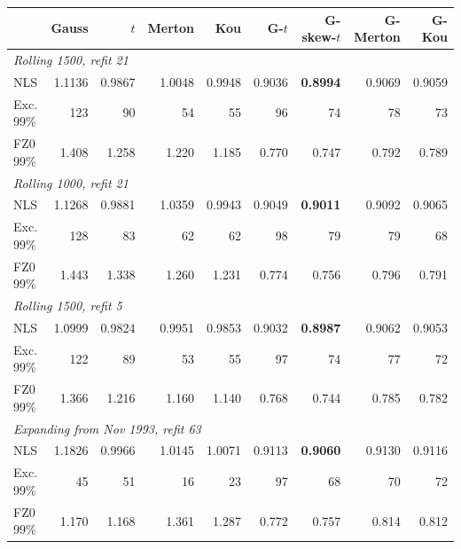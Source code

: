 \begin{tabular}{lrrrrrrrr}
\toprule
 & Gauss & $t$ & Merton & Kou & G-$t$ & G-skew-$t$ & G-Merton & G-Kou \\
\midrule
\multicolumn{9}{l}{\textit{Rolling 1500, refit 21}} \\
\quad NLS & 1.1136 & 0.9867 & 1.0048 & 0.9948 & 0.9036 & \textbf{0.8994} & 0.9069 & 0.9059 \\
\quad Exc. 99\% & 123 & 90 & 54 & 55 & 96 & 74 & 78 & 73 \\
\quad FZ0 99\% & 1.408 & 1.258 & 1.220 & 1.185 & 0.770 & 0.747 & 0.792 & 0.789 \\
\multicolumn{9}{l}{\textit{Rolling 1000, refit 21}} \\
\quad NLS & 1.1268 & 0.9881 & 1.0359 & 0.9943 & 0.9049 & \textbf{0.9011} & 0.9092 & 0.9065 \\
\quad Exc. 99\% & 128 & 83 & 62 & 62 & 98 & 79 & 79 & 68 \\
\quad FZ0 99\% & 1.443 & 1.338 & 1.260 & 1.231 & 0.774 & 0.756 & 0.796 & 0.791 \\
\multicolumn{9}{l}{\textit{Rolling 1500, refit 5}} \\
\quad NLS & 1.0999 & 0.9824 & 0.9951 & 0.9853 & 0.9032 & \textbf{0.8987} & 0.9062 & 0.9053 \\
\quad Exc. 99\% & 122 & 89 & 53 & 55 & 97 & 74 & 77 & 72 \\
\quad FZ0 99\% & 1.366 & 1.216 & 1.160 & 1.140 & 0.768 & 0.744 & 0.785 & 0.782 \\
\multicolumn{9}{l}{\textit{Expanding from Nov 1993, refit 63}} \\
\quad NLS & 1.1826 & 0.9966 & 1.0145 & 1.0071 & 0.9113 & \textbf{0.9060} & 0.9130 & 0.9116 \\
\quad Exc. 99\% & 45 & 51 & 16 & 23 & 97 & 68 & 70 & 72 \\
\quad FZ0 99\% & 1.170 & 1.168 & 1.361 & 1.287 & 0.772 & 0.757 & 0.814 & 0.812 \\
\bottomrule
\end{tabular}
